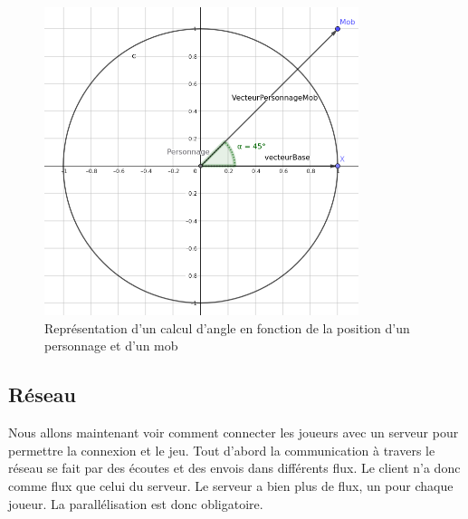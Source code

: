\documentclass[11pt]{article}
\begin{document}
            \begin{figure}[H]
                \centering
                \includegraphics[height=9cm]{cercleTrigo.png}
                \caption{Représentation d'un calcul d'angle en fonction de la position d'un personnage et d'un mob}
                \label{fig:Mob}
            \end{figure}

        \subsection{Réseau}
        Nous allons maintenant voir comment connecter les joueurs avec un serveur pour permettre la connexion et le jeu.
	    Tout d’abord la communication à travers le réseau se fait par des écoutes et des envois dans différents flux. 
        Le client n’a donc comme flux que celui du serveur. Le serveur a bien plus de flux, un pour chaque joueur. 
        La parallélisation est donc obligatoire.
\end{document}
